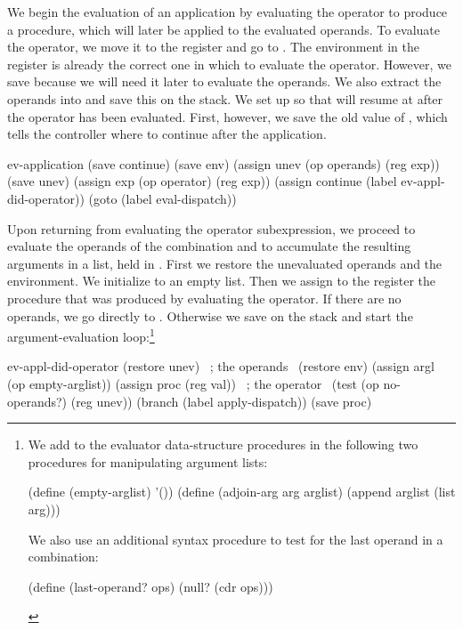 We begin the evaluation of an application by evaluating the operator to produce
a procedure, which will later be applied to the evaluated operands.  To
evaluate the operator, we move it to the  register and go to
.  The environment in the  register is already
the correct one in which to evaluate the operator.  However, we save 
because we will need it later to evaluate the operands.  We also extract the
operands into  and save this on the stack.  We set up
 so that  will resume at
 after the operator has been evaluated.  First,
however, we save the old value of , which tells the controller
where to continue after the application.

\begin{codeBlock}
ev-application
  (save continue)
  (save env)
  (assign unev (op operands) (reg exp))
  (save unev)
  (assign exp (op operator) (reg exp))
  (assign continue (label ev-appl-did-operator))
  (goto (label eval-dispatch))
\end{codeBlock}

\noindent
Upon returning from evaluating the operator subexpression, we proceed to
evaluate the operands of the combination and to accumulate the resulting
arguments in a list, held in .  First we restore the unevaluated
operands and the environment.  We initialize  to an empty list.
Then we assign to the  register the procedure that was produced by
evaluating the operator.  If there are no operands, we go directly to
.  Otherwise we save  on the stack and start
the argument-evaluation loop:\footnote{We add to the evaluator data-structure
procedures in  the following two procedures for manipulating
argument lists:

\begin{compactCodeBlock}
(define (empty-arglist) '())
(define (adjoin-arg arg arglist) (append arglist (list arg)))
\end{compactCodeBlock}

We also use an additional syntax procedure to test for the last operand in a
combination:

\begin{compactCodeBlock}
(define (last-operand? ops) (null? (cdr ops)))
\end{compactCodeBlock} }

\begin{codeBlock}
ev-appl-did-operator
  (restore unev)                       ~\textrm{; the operands}~
  (restore env)
  (assign argl (op empty-arglist))
  (assign proc (reg val))              ~\textrm{; the operator}~
  (test (op no-operands?) (reg unev))
  (branch (label apply-dispatch))
  (save proc)
\end{codeBlock}

